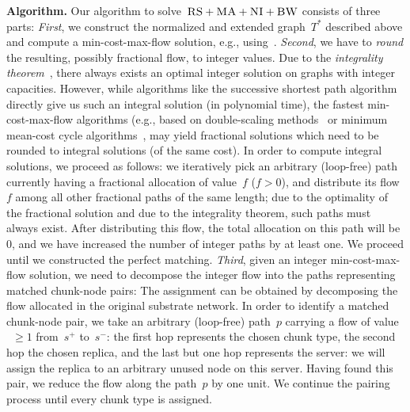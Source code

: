 \documentclass[preprint,12pt]{elsarticle}
\newcommand{\Source}{\ensuremath{s^{+}}}
\newcommand{\Sink}{\ensuremath{s^{-}}}
\newcommand{\CC}{\textsc{NI}}
\newcommand{\RS}{\textsc{RS}}
\newcommand{\BW}{\textsc{BW}}
\newcommand{\MA}{\textsc{MA}}
\newcommand{\Tree}{\ensuremath{T}}
\begin{document}
\textbf{Algorithm.}
Our algorithm to solve~$\RS+\MA+\CC+\BW$ consists of three parts:
\emph{First}, we construct the normalized and extended graph~$\Tree^*$
described above and compute
a min-cost-max-flow solution, e.g.,
using~\cite{mincostmaxflow-1,mincostmaxflow-2}.
\emph{Second}, we have to \emph{round} the resulting, possibly fractional flow, to
integer values. Due to the \emph{integrality theorem}~\cite{flow-book},
there always exists an optimal integer solution on graphs with integer capacities.
However, while algorithms like the successive shortest path algorithm~\cite{successive_shortest_path_complexity}
directly give us such an integral solution (in polynomial time), the fastest min-cost-max-flow algorithms (e.g., based on double-scaling
methods~\cite{mincostmaxflow-1} or minimum mean-cost cycle
algorithms~\cite{mincostmaxflow-2}, may yield fractional solutions
which need to be rounded to integral solutions (of the same cost).
In order to compute integral solutions, we proceed as follows: we iteratively
pick an arbitrary (loop-free) path
currently having a fractional allocation of value~$f$ ($f>0$), and distribute its flow~$f$
among all other fractional paths of the same length; due to the optimality of the fractional solution
and due to the integrality theorem, such paths must always exist. After distributing this flow,
the total allocation on this path will be 0, and we have increased the number of
integer paths by at least one. We proceed until we constructed the perfect
matching.
\emph{Third}, given an integer min-cost-max-flow solution, we need to decompose
the integer flow into the paths
representing matched chunk-node pairs:
The assignment can be obtained by decomposing the flow allocated in the
original substrate network. In order to identify a matched chunk-node pair,
we take an arbitrary (loop-free) path~$p$ carrying a flow of value ~$\geq 1$ from~$\Source$ to~$\Sink$:
the first hop represents the chosen chunk type, the second hop the chosen
replica, and the last but one hop represents the server: we will assign
the replica to an arbitrary unused node on this server.
Having found this pair, we reduce the flow
along the path~$p$ by one unit.
We continue the pairing process until every chunk type is assigned.
\end{document}
